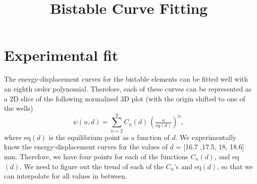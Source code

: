 \documentclass[10pt]{article}
\title{\bf Bistable Curve Fitting}
\date{\vspace{-15ex}}
\begin{document}
\maketitle
\hrulefill

\section{Experimental fit}
The energy-displacement curves for the bistable elements can be fitted well with an eighth order polynomial. Therefore, each of these curves can be represented as a 2D slice of the following normalized 3D plot (with the origin shifted to one of the wells)
\begin{equation}
	\psi(u,d) = \sum_{n=2}^{8} C_{n}(d) \,\left(\tfrac{u}{\text{eq}(d)}\right)^n,
\end{equation}
where eq$(d)$ is the equilibrium point as a function of $d$. We experimentally know the energy-displacement curves for the values of $d$ = [16.7 ,17.5, 18, 18.6] mm. Therefore, we have four points for each of the functions $C_n(d)$, and eq$(d)$. We need to figure out the trend of each of the $C_n$'s and eq$(d)$, so that we can interpolate for all values in between.
\end{document}
